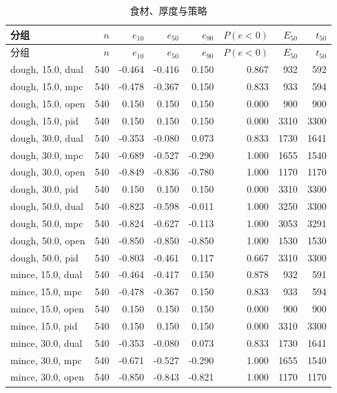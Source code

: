 \begin{longtable}{lrrrrrrr}
\caption{食材、厚度与策略}\\
\toprule
分组 & $n$ & $e_{10}$ & $e_{50}$ & $e_{90}$ & $P(e{<}0)$ & $E_{50}$ & $t_{50}$ \\
\midrule
\endfirsthead
\toprule
分组 & $n$ & $e_{10}$ & $e_{50}$ & $e_{90}$ & $P(e{<}0)$ & $E_{50}$ & $t_{50}$ \\
\midrule
\endhead
dough, 15.0, dual & 540 & -0.464 & -0.416 & 0.150 & 0.867 & 932 & 592 \\
dough, 15.0, mpc & 540 & -0.478 & -0.367 & 0.150 & 0.833 & 933 & 594 \\
dough, 15.0, open & 540 & 0.150 & 0.150 & 0.150 & 0.000 & 900 & 900 \\
dough, 15.0, pid & 540 & 0.150 & 0.150 & 0.150 & 0.000 & 3310 & 3300 \\
dough, 30.0, dual & 540 & -0.353 & -0.080 & 0.073 & 0.833 & 1730 & 1641 \\
dough, 30.0, mpc & 540 & -0.689 & -0.527 & -0.290 & 1.000 & 1655 & 1540 \\
dough, 30.0, open & 540 & -0.849 & -0.836 & -0.780 & 1.000 & 1170 & 1170 \\
dough, 30.0, pid & 540 & 0.150 & 0.150 & 0.150 & 0.000 & 3310 & 3300 \\
dough, 50.0, dual & 540 & -0.823 & -0.598 & -0.011 & 1.000 & 3250 & 3300 \\
dough, 50.0, mpc & 540 & -0.824 & -0.627 & -0.113 & 1.000 & 3053 & 3291 \\
dough, 50.0, open & 540 & -0.850 & -0.850 & -0.850 & 1.000 & 1530 & 1530 \\
dough, 50.0, pid & 540 & -0.803 & -0.461 & 0.117 & 0.667 & 3310 & 3300 \\
mince, 15.0, dual & 540 & -0.464 & -0.417 & 0.150 & 0.878 & 932 & 591 \\
mince, 15.0, mpc & 540 & -0.478 & -0.367 & 0.150 & 0.833 & 933 & 594 \\
mince, 15.0, open & 540 & 0.150 & 0.150 & 0.150 & 0.000 & 900 & 900 \\
mince, 15.0, pid & 540 & 0.150 & 0.150 & 0.150 & 0.000 & 3310 & 3300 \\
mince, 30.0, dual & 540 & -0.353 & -0.080 & 0.073 & 0.833 & 1730 & 1641 \\
mince, 30.0, mpc & 540 & -0.671 & -0.527 & -0.290 & 1.000 & 1655 & 1540 \\
mince, 30.0, open & 540 & -0.850 & -0.843 & -0.821 & 1.000 & 1170 & 1170 \\

\end{longtable}
